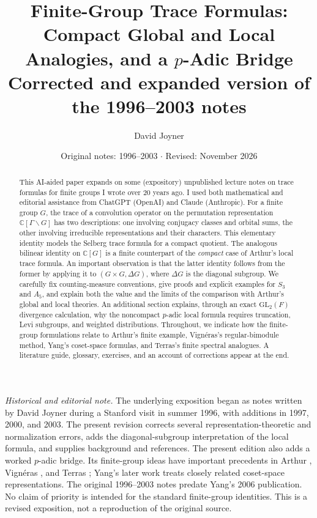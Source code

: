 \documentclass[12pt]{article}
\title{\textbf{Finite-Group Trace Formulas:}\\
Compact Global and Local Analogies, and a $p$-Adic Bridge\\[5pt]
\large Corrected and expanded version of the 1996--2003 notes}
\author{David Joyner}
\date{Original notes: 1996--2003 \quad $\cdot$ \quad Revised: November 2026}
\theoremstyle{remark}
\newcommand{\C}{\mathbb C}
\begin{document}
\maketitle
\begin{abstract}
This AI-aided paper expands on some (expository) unpublished lecture
notes on trace formulas for finite groups I wrote over 20 years ago.
I used both mathematical and editorial assistance from ChatGPT (OpenAI)
and Claude (Anthropic).
For a finite group $G$, the trace of a convolution operator on the
permutation representation $\C[\Gamma\backslash G]$ has two descriptions:
one involving conjugacy classes and orbital sums, the other involving
irreducible representations and their characters.  This elementary identity
models the Selberg trace formula for a compact quotient.  The analogous
bilinear identity on $\C[G]$ is a finite counterpart of the \emph{compact}
case of Arthur's local trace formula.  An important observation is that the
latter identity follows from the former by applying it to
$(G\times G,\Delta G)$, where $\Delta G$ is the diagonal subgroup.
We carefully fix counting-measure conventions, give proofs and explicit
examples for $S_3$ and $A_5$, and explain both the value and the limits
of the comparison with Arthur's global and local theories.
An additional section explains, through an exact $\mathrm{GL}_2(F)$
divergence calculation, why the noncompact $p$-adic local formula
requires truncation, Levi subgroups, and weighted distributions.
Throughout, we indicate how the finite-group formulations relate to
Arthur's finite example, Vign\'eras's regular-bimodule method,
Yang's coset-space formulas, and Terras's finite spectral analogues.
A literature guide, glossary, exercises, and an account of corrections
appear at the end.
\end{abstract}
\noindent\textit{Historical and editorial note.}
The underlying exposition began as notes written by David Joyner during a
Stanford visit in summer 1996, with additions in 1997, 2000, and 2003.
The present revision corrects several representation-theoretic and
normalization errors, adds the diagonal-subgroup interpretation of the
local formula, and supplies background and references. The present edition also
adds a worked $p$-adic bridge. Its finite-group ideas have important
precedents in Arthur \cite{ArthurHecke1989}, Vign\'eras
\cite{Vigneras1991}, and Terras \cite{Terras1999}; Yang's later
work \cite{Yang2006} treats closely related coset-space representations.
The original 1996--2003 notes predate Yang's 2006 publication. No
claim of priority is intended for the standard finite-group identities.
This is a revised exposition, not a reproduction of the original source.
\tableofcontents
\end{document}
